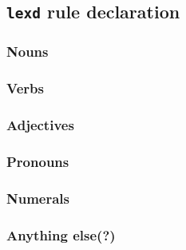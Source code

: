 \subsection{\texttt{lexd} rule declaration}
\subsubsection{Nouns}
\subsubsection{Verbs}
\subsubsection{Adjectives}
\subsubsection{Pronouns}
\subsubsection{Numerals}
\subsubsection{Anything else(?)}
